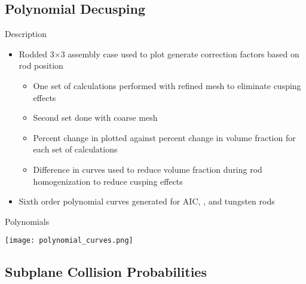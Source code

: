 \subsection{Polynomial Decusping}
\begin{frame}[t]{Description}

\begin{itemize}
    \item Rodded 3$\times$3 assembly case used to plot generate correction factors based on rod position
    \begin{itemize}
        \item One set of calculations performed with refined mesh to eliminate cusping effects
        \item Second set done with coarse mesh
        \item Percent change in \keff{} plotted against percent change in volume fraction for each set of calculations
        \item Difference in curves used to reduce volume fraction during rod homogenization to reduce cusping effects
    \end{itemize}
    \item Sixth order polynomial curves generated for AIC, \bfc{}, and tungsten rods
\end{itemize}

\end{frame}


\begin{frame}[t]{Polynomials}
    
\begin{center}
    \texttt{[image: polynomial\_curves.png]}
\end{center}
    
\end{frame}


\subsection{Subplane Collision Probabilities}

